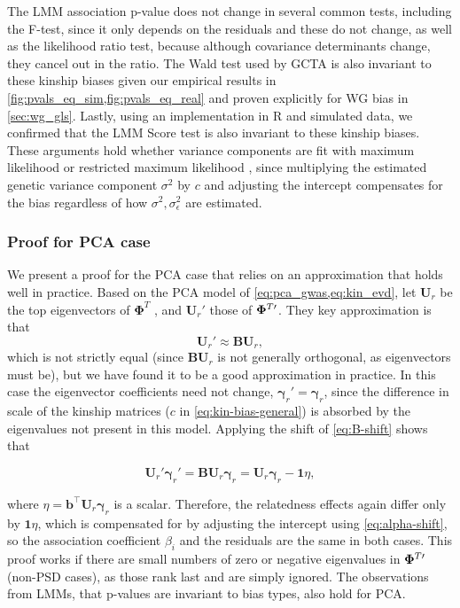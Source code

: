 \documentclass[11pt]{article}
\newcommand{\kinMat}[1][T]{%
  \ensuremath{%
    \mathbf{\Phi}^{#1}
  }%
  \xspace%
}%
\newcommand{\kinMatPrime}{%
  \ensuremath{%
    \mathbf{\Phi}^{T\prime}
  }%
  \xspace%
}%
\begin{document}
\begin{linenumbers}
The LMM association p-value does not change in several common tests, including the F-test, since it only depends on the residuals and these do not change, as well as the likelihood ratio test, because although covariance determinants change, they cancel out in the ratio.
The Wald test used by GCTA \citep{yang_advantages_2014} is also invariant to these kinship biases given our empirical results in \cref{fig:pvals_eq_sim,fig:pvals_eq_real} and proven explicitly for WG bias in \cref{sec:wg_gls}.
Lastly, using an implementation in R and simulated data, we confirmed that the LMM Score test is also invariant to these kinship biases.
These arguments hold whether variance components are fit with maximum likelihood or restricted maximum likelihood \citep{kang_efficient_2008, kang_variance_2010, yang_advantages_2014}, since multiplying the estimated genetic variance component $\sigma^2$ by $c$ and adjusting the intercept compensates for the bias regardless of how $\sigma^2, \sigma^2_\epsilon$ are estimated.

\subsubsection{Proof for PCA case}

We present a proof for the PCA case that relies on an approximation that holds well in practice.
Based on the PCA model of \cref{eq:pca_gwas,eq:kin_evd}, let $\mathbf{U}_r$ be the top eigenvectors of \kinMat, and $\mathbf{U}_r'$ those of $\kinMatPrime$.
They key approximation is that
\begin{equation}
  \label{eq:pc-shift}
  \mathbf{U}_r' \approx \mathbf{B} \mathbf{U}_r,
\end{equation}
which is not strictly equal (since $\mathbf{B} \mathbf{U}_r$ is not generally orthogonal, as eigenvectors must be), but we have found it to be a good approximation in practice.
In this case the eigenvector coefficients need not change, $\boldsymbol{\gamma}_r' = \boldsymbol{\gamma}_r$, since the difference in scale of the kinship matrices ($c$ in \cref{eq:kin-bias-general}) is absorbed by the eigenvalues not present in this model.
Applying the shift of \cref{eq:B-shift} shows that
\begin{linenomath*}
$$
\mathbf{U}_r' \boldsymbol{\gamma}_r'
=
\mathbf{B} \mathbf{U}_r \boldsymbol{\gamma}_r
=
\mathbf{U}_r \boldsymbol{\gamma}_r - \mathbf{1} \eta,
$$
\end{linenomath*}
where
$\eta = \mathbf{b}^\intercal \mathbf{U}_r \boldsymbol{\gamma}_r$
is a scalar.
Therefore, the relatedness effects again differ only by $\mathbf{1} \eta$, which is compensated for by adjusting the intercept using \cref{eq:alpha-shift}, so the association coefficient $\beta_i$ and the residuals are the same in both cases.
This proof works if there are small numbers of zero or negative eigenvalues in $\kinMatPrime$ (non-PSD cases), as those rank last and are simply ignored.
The observations from LMMs, that p-values are invariant to bias types, also hold for PCA.


\end{linenumbers}
\end{document}
